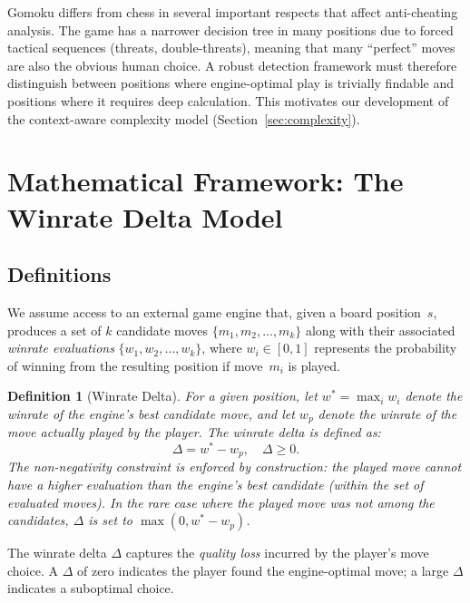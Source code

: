 \documentclass[11pt,a4paper]{article}
\newtheorem{definition}{Definition}
\begin{document}
Gomoku differs from chess in several important respects that affect anti-cheating
analysis. The game has a narrower decision tree in many positions due to forced
tactical sequences (threats, double-threats), meaning that many ``perfect''
moves are also the obvious human choice. A robust detection framework must
therefore distinguish between positions where engine-optimal play is trivially
findable and positions where it requires deep calculation. This motivates our
development of the context-aware complexity model (Section~\ref{sec:complexity}).


\section{Mathematical Framework: The Winrate Delta Model}
\label{sec:framework}

\subsection{Definitions}

We assume access to an external game engine that, given a board position~$s$,
produces a set of $k$ candidate moves $\{m_1, m_2, \ldots, m_k\}$ along with
their associated \emph{winrate evaluations} $\{w_1, w_2, \ldots, w_k\}$, where
$w_i \in [0, 1]$ represents the probability of winning from the resulting
position if move~$m_i$ is played.

\begin{definition}[Winrate Delta]
\label{def:delta}
For a given position, let $w^* = \max_i w_i$ denote the winrate of the
engine's best candidate move, and let $w_p$ denote the winrate of the move
actually played by the player. The \emph{winrate delta} is defined as:
\begin{equation}
    \Delta = w^* - w_p, \quad \Delta \geq 0.
    \label{eq:delta}
\end{equation}
The non-negativity constraint is enforced by construction: the played move
cannot have a higher evaluation than the engine's best candidate (within the
set of evaluated moves). In the rare case where the played move was not among
the candidates, $\Delta$ is set to $\max(0, w^* - w_p)$.
\end{definition}

The winrate delta $\Delta$ captures the \emph{quality loss} incurred by the
player's move choice. A $\Delta$ of zero indicates the player found the
engine-optimal move; a large $\Delta$ indicates a suboptimal choice.
\end{document}
